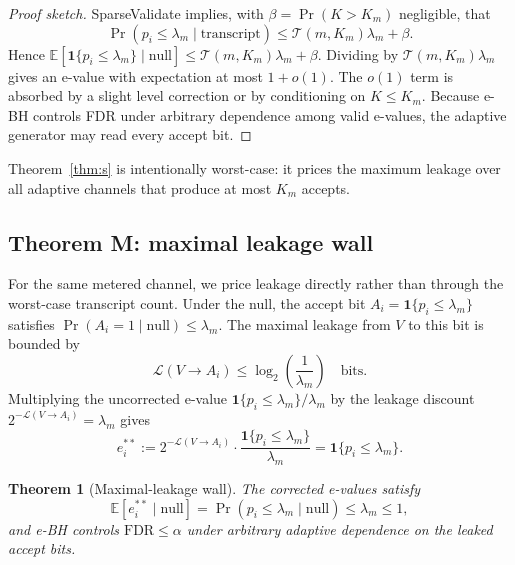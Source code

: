 \documentclass[sigconf]{acmart}
\theoremstyle{plain}
\newtheorem{theorem}{Theorem}[section]
\begin{document}
\begin{proof}[Proof sketch]
SparseValidate implies, with $\beta=\Pr(K>K_m)$ negligible, that
\begin{equation}
\Pr(p_i\le\lambda_m\mid\text{transcript})
\le \mathcal{T}(m,K_m)\lambda_m+\beta.
\end{equation}
Hence
$\mathbb{E}[\mathbf{1}\{p_i\le\lambda_m\}\mid\text{null}]\le\mathcal{T}(m,K_m)\lambda_m+\beta$.
Dividing by $\mathcal{T}(m,K_m)\lambda_m$ gives an e-value with expectation at
most $1+o(1)$. The $o(1)$ term is absorbed by a slight level correction or by
conditioning on $K\le K_m$. Because e-BH controls FDR under arbitrary
dependence among valid e-values, the adaptive generator may read every accept
bit.
\end{proof}

Theorem~\ref{thm:s} is intentionally worst-case: it prices the maximum leakage
over all adaptive channels that produce at most $K_m$ accepts.

\subsection{Theorem M: maximal leakage wall}\label{sec:theorem-m}

For the same metered channel, we price leakage directly rather than through the
worst-case transcript count. Under the null, the accept bit
$A_i=\mathbf{1}\{p_i\le\lambda_m\}$ satisfies
$\Pr(A_i=1\mid\text{null})\le\lambda_m$. The maximal leakage from $V$ to
this bit is bounded by
\begin{equation}
\mathcal{L}(V\to A_i) \le \log_2\!\left(\frac{1}{\lambda_m}\right)
\quad\text{bits}.
\end{equation}
Multiplying the uncorrected e-value
$\mathbf{1}\{p_i\le\lambda_m\}/\lambda_m$ by the leakage discount
$2^{-\mathcal{L}(V\to A_i)}=\lambda_m$ gives
\begin{equation}
e_i^{**} := 2^{-\mathcal{L}(V\to A_i)} \cdot
            \frac{\mathbf{1}\{p_i\le\lambda_m\}}{\lambda_m}
          = \mathbf{1}\{p_i\le\lambda_m\}.
\end{equation}

\begin{theorem}[Maximal-leakage wall]\label{thm:m}
The corrected e-values satisfy
\begin{equation}
\mathbb{E}\left[ e_i^{**} \mid \text{null} \right]
= \Pr(p_i\le\lambda_m\mid\text{null})
\le \lambda_m \le 1,
\end{equation}
and e-BH controls $\mathrm{FDR}\le\alpha$ under arbitrary adaptive
dependence on the leaked accept bits.
\end{theorem}
\end{document}
